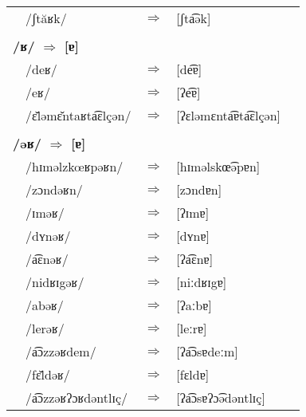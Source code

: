 \begin{longtable}[l]{p{0.1mm}lcll}
    & /ʃtăʁk/            & $\Rightarrow$ & [ʃta͡ək]             &                                   \\
  \multicolumn{5}{l}{ }                                                                            \\
  \multicolumn{5}{l}{\textbf{/ʁ/ $\Rightarrow$ [ɐ]}}                                               \\
    & /deʁ/              & $\Rightarrow$ & [de͡ɐ]               &                                   \\
    & /eʁ/               & $\Rightarrow$ & [ʔe͡ɐ]               &                                   \\
    & /ɛ̆ləmɛ̆ntaʁta͡ɛlçən/ & $\Rightarrow$ & [ʔɛləmɛnta͡ɐta͡ɛlçən] &                                   \\
  \multicolumn{5}{l}{ }                                                                            \\
  \multicolumn{5}{l}{\textbf{/əʁ/ $\Rightarrow$ [ɐ]}}                                              \\
    & /hɪməlzkœʁpəʁn/    & $\Rightarrow$ & [hɪməlskœ͡əpɐn]      &                                   \\
    & /zɔndəʁn/          & $\Rightarrow$ & [zɔndɐn]            &                                   \\
    & /ɪməʁ/             & $\Rightarrow$ & [ʔɪmɐ]              &                                   \\
    & /dʏnəʁ/            & $\Rightarrow$ & [dʏnɐ]              &                                   \\
    & /a͡ɛnəʁ/            & $\Rightarrow$ & [ʔa͡ɛnɐ]             &                                   \\
    & /nidʁɪgəʁ/         & $\Rightarrow$ & [niːdʁɪgɐ]          &                                   \\
    & /abəʁ/             & $\Rightarrow$ & [ʔaːbɐ]             &                                   \\
    & /lerəʁ/            & $\Rightarrow$ & [leːrɐ]             &                                   \\
    & /a͡ɔzzəʁdem/        & $\Rightarrow$ & [ʔa͡ɔsɐdeːm]         &                                   \\
    & /fɛ̆ldəʁ/           & $\Rightarrow$ & [fɛldɐ]             &                                   \\
    & /a͡ɔzzəʁʔɔʁdəntlɪç/ & $\Rightarrow$ & [ʔa͡ɔsɐʔɔ͡ədəntlɪç]   &                                   \\

\end{longtable}
